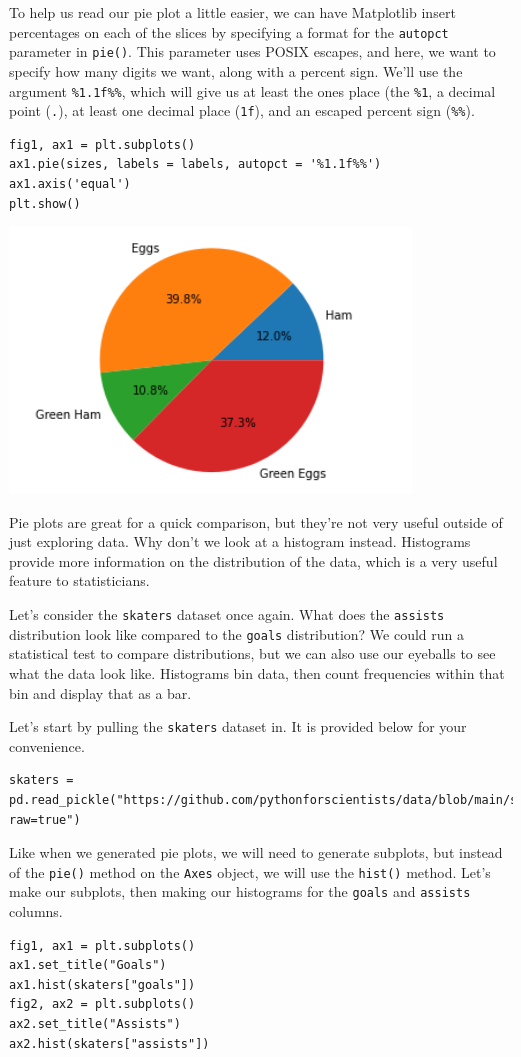 To help us read our pie plot a little easier, we can have Matplotlib insert percentages on each of the slices by specifying a format for the \verb|autopct| parameter in \verb|pie()|. This parameter uses POSIX escapes, and here, we want to specify how many digits we want, along with a percent sign. We'll use the argument \verb|%1.1f%%|, which will give us at least the ones place (the \verb|%1|, a decimal point (\verb|.|), at least one decimal place (\verb|1f|), and an escaped percent sign (\verb|%%|).

\begin{lstlisting}[style=pippython]
fig1, ax1 = plt.subplots()
ax1.pie(sizes, labels = labels, autopct = '%1.1f%%')
ax1.axis('equal')
plt.show()
\end{lstlisting}

\includegraphics[width=0.8\textwidth]{img/pie2.png}

Pie plots are great for a quick comparison, but they're not very useful outside of just exploring data. Why don't we look at a histogram instead. Histograms provide more information on the distribution of the data, which is a very useful feature to statisticians.\par
Let's consider the \verb|skaters| dataset once again. What does the \verb|assists| distribution look like compared to the \verb|goals| distribution? We could run a statistical test to compare distributions, but we can also use our eyeballs to see what the data look like. Histograms bin data, then count frequencies within that bin and display that as a bar.\par
Let's start by pulling the \verb|skaters| dataset in. It is provided below for your convenience.\par
\begin{lstlisting}[style=pippython]
skaters = pd.read_pickle("https://github.com/pythonforscientists/data/blob/main/skaters.pkl?raw=true")
\end{lstlisting}
Like when we generated pie plots, we will need to generate subplots, but instead of the \verb|pie()| method on the \verb|Axes| object, we will use the \verb|hist()| method. Let's make our subplots, then making our histograms for the \verb|goals| and \verb|assists| columns.\par
\begin{lstlisting}[style=pippython]
fig1, ax1 = plt.subplots()
ax1.set_title("Goals")
ax1.hist(skaters["goals"])
fig2, ax2 = plt.subplots()
ax2.set_title("Assists")
ax2.hist(skaters["assists"])
\end{lstlisting}

